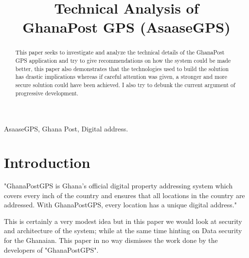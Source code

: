 \documentclass[conference,compsoc]{IEEEtran}
\begin{document}
\title{Technical Analysis of\\ GhanaPost GPS (AsaaseGPS)}

\author{
}

\maketitle

\begin{abstract}
This paper seeks to investigate and analyze the technical details of the GhanaPost GPS application and try to give recommendations on how the system could be made better, 
this paper also demonstrates that the technologies used to build the solution
has drastic implications whereas if careful attention was given, a stronger and more secure solution could have been achieved. I also try to debunk the current argument of progressive development.
\end{abstract}

\begin{IEEEkeywords} 
	AsaaseGPS, Ghana Post, Digital address. 
\end{IEEEkeywords}


\section{Introduction}
\IEEEPARstart
"GhanaPostGPS is Ghana’s official digital property addressing system which covers every inch of the country and ensures that all locations in the country are addressed. With GhanaPostGPS, every location has a unique digital address."\cite{ghanapost:about}
\newline

This is certainly a very modest idea but in this paper we would look at security and architecture of the system; while at the same time hinting on Data security for the Ghanaian.
\newline
This paper in no way dismisses the work done by the developers of "GhanaPostGPS".
\end{document}
